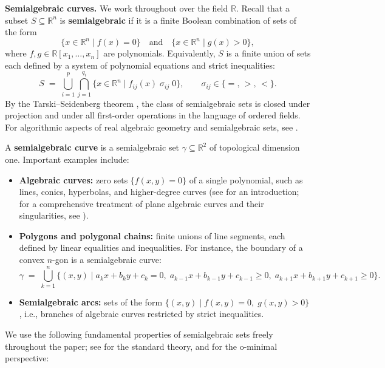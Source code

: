 \documentclass[article,11pt]{amsart} \numberwithin{equation}{section}
\numberwithin{equation}{section}
\begin{document}
{\medskip
\noindent\textbf{Semialgebraic curves.}
We work throughout over the field $\mathbb{R}$. Recall that a subset 
$S \subseteq \mathbb{R}^n$ is \textbf{semialgebraic} if it is a finite Boolean 
combination of sets of the form
\[
\{ x \in \mathbb{R}^n \mid f(x) = 0 \}
\quad\text{and}\quad
\{ x \in \mathbb{R}^n \mid g(x) > 0 \},
\]
where $f, g \in \mathbb{R}[x_1, \dots, x_n]$ are polynomials. Equivalently, 
$S$ is a finite union of sets each defined by a system of polynomial equations 
and strict inequalities:
\[
S \;=\; \bigcup_{i=1}^{p} \bigcap_{j=1}^{q_i} 
\bigl\{ x \in \mathbb{R}^n \;\big|\; 
f_{ij}(x) \;\sigma_{ij}\; 0 \bigr\},
\qquad \sigma_{ij} \in \{=,\, >,\, <\}.
\]
By the Tarski--Seidenberg theorem \cite{BochnakCosteRoy}, the class of 
semialgebraic sets is closed under projection and under all first-order 
operations in the language of ordered fields. For algorithmic aspects of real 
algebraic geometry and semialgebraic sets, see \cite{BasuPollackRoy}.

A \textbf{semialgebraic curve} is a semialgebraic set $\gamma \subseteq 
\mathbb{R}^2$ of topological dimension one. Important examples include:

\begin{itemize}
	\item \textbf{Algebraic curves:} zero sets $\{f(x,y)=0\}$ of a single 
	polynomial, such as lines, conics, hyperbolas, and higher-degree curves 
	(see \cite{Fulton} for an introduction; for a comprehensive treatment of 
	plane algebraic curves and their singularities, see \cite{BrieskornKnorrer}).
	
	\item \textbf{Polygons and polygonal chains:} finite unions of line segments, 
	each defined by linear equalities and inequalities. For instance, the boundary 
	of a convex $n$-gon is a semialgebraic curve:
	\[
	\gamma \;=\; \bigcup_{k=1}^{n} 
	\bigl\{ (x,y) \;\big|\; 
	a_k x + b_k y + c_k = 0,\; 
	a_{k-1}x + b_{k-1}y + c_{k-1} \ge 0,\; 
	a_{k+1}x + b_{k+1}y + c_{k+1} \ge 0 
	\bigr\}.
	\]
	
	\item \textbf{Semialgebraic arcs:} sets of the form 
	$\{(x,y) \mid f(x,y) = 0,\; g(x,y) > 0\}$, i.e., branches of algebraic 
	curves restricted by strict inequalities.
\end{itemize}

We use the following fundamental properties of semialgebraic sets freely 
throughout the paper; see \cite{BochnakCosteRoy, BenedettiRisler, Coste} 
for the standard theory, and \cite{vandenDries} for the o-minimal perspective:

}
\end{document}
